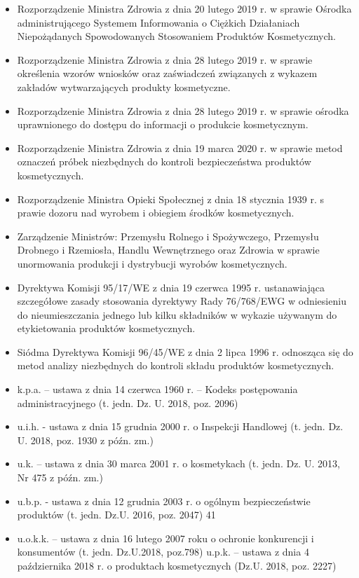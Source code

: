 \begin{itemize}
	\item Rozporządzenie Ministra Zdrowia z dnia 20 lutego 2019 r. w sprawie Ośrodka administrującego Systemem Informowania o Ciężkich Działaniach Niepożądanych Spowodowanych Stosowaniem Produktów Kosmetycznych.
	\item Rozporządzenie Ministra Zdrowia z dnia 28 lutego 2019 r. w sprawie określenia wzorów wniosków oraz zaświadczeń związanych z wykazem zakładów wytwarzających produkty kosmetyczne.
	\item Rozporządzenie Ministra Zdrowia z dnia 28 lutego 2019 r. w sprawie ośrodka uprawnionego do dostępu do informacji o produkcie kosmetycznym.
	\item Rozporządzenie Ministra Zdrowia z dnia 19 marca 2020 r. w sprawie metod oznaczeń próbek niezbędnych do kontroli bezpieczeństwa produktów kosmetycznych.
	\item Rozporządzenie Ministra Opieki Społecznej z dnia 18 stycznia 1939 r. s prawie  dozoru nad wyrobem i obiegiem środków kosmetycznych.
	\item Zarządzenie Ministrów: Przemysłu Rolnego i Spożywczego, Przemysłu Drobnego i Rzemiosła, Handlu Wewnętrznego oraz Zdrowia w sprawie unormowania produkcji i dystrybucji wyrobów kosmetycznych.
	\item Dyrektywa Komisji 95/17/WE z dnia 19 czerwca 1995 r. ustanawiająca szczegółowe zasady stosowania dyrektywy Rady 76/768/EWG w odniesieniu do nieumieszczania jednego lub kilku składników w wykazie używanym do etykietowania produktów kosmetycznych.
	\item Siódma Dyrektywa Komisji 96/45/WE z dnia 2 lipca 1996 r. odnosząca się do metod analizy niezbędnych do kontroli składu produktów kosmetycznych.
	\item k.p.a. – ustawa z dnia 14 czerwca 1960 r. – Kodeks postępowania administracyjnego (t. jedn. Dz. U. 2018, poz. 2096)
	\item u.i.h. - ustawa z dnia 15 grudnia 2000 r. o Inspekcji Handlowej (t. jedn. Dz. U. 2018, poz. 1930 z późn. zm.)
	\item u.k. – ustawa z dnia 30 marca 2001 r. o kosmetykach (t. jedn. Dz. U. 2013, Nr 475 z późn. zm.)
	\item u.b.p. - ustawa z dnia 12 grudnia 2003 r. o ogólnym bezpieczeństwie produktów (t. jedn. Dz.U. 2016, poz. 2047) 41
	\item u.o.k.k. – ustawa z dnia 16 lutego 2007 roku o ochronie konkurencji i konsumentów (t. jedn. Dz.U.2018, poz.798) u.p.k. – ustawa z dnia 4 października 2018 r. o produktach kosmetycznych (Dz.U. 2018, poz. 2227)

\end{itemize}
